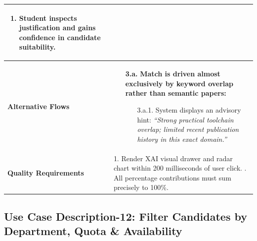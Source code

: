 \begin{table}[H]
\begin{tabularx}{\textwidth}{|l|X|}
\begin{enumerate}[leftmargin=*]
    \item Student inspects justification and gains confidence in candidate suitability.
\end{enumerate} \\ \hline
\textbf{Alternative Flows} &
\begin{itemize}[leftmargin=*]
    \item[\textbf{3.a.}] \textbf{Match is driven almost exclusively by keyword overlap rather than semantic papers:}
    \begin{itemize}[leftmargin=*]
        \item[3.a.1.] System displays an advisory hint: \textit{``Strong practical toolchain overlap; limited recent publication history in this exact domain.''}
    \end{itemize}
\end{itemize} \\ \hline
\textbf{Quality Requirements} & 
1. Render XAI visual drawer and radar chart within 200 milliseconds of user click. \newline
2. All percentage contributions must sum precisely to 100\%. \\ \hline
\end{tabularx}
\end{table}

\clearpage
\subsection{Use Case Description-12: Filter Candidates by Department, Quota \& Availability}
\label{subsec:uc12}

